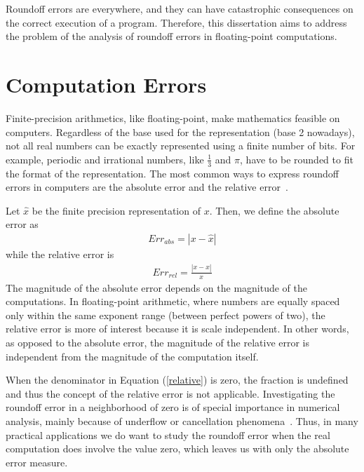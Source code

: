 Roundoff errors are everywhere, and they can have catastrophic consequences on the correct execution of a program.
%
Therefore, this dissertation aims to address the problem of the analysis of roundoff errors in floating-point computations.
%
\section{Computation Errors}
%

Finite-precision arithmetics, like floating-point, make mathematics feasible on computers. 
%
Regardless of the base used for the representation (base 2 nowadays), not all real numbers can be exactly represented using a finite number of bits.
%
For example, periodic and irrational numbers, like $\frac{1}{3}$ and $\pi$, have to be rounded to fit the format of the representation. 
%
%
%
The most common ways to express roundoff errors in computers are the absolute error and the relative error~\cite{higham2002accuracy}.
%

Let $\widehat{x}$ be the finite precision representation of $x$. Then, we define the absolute error as
%
\begin{align}
Err_{abs}=|x-\widehat{x}|\label{absolute}
\end{align}
%
while the relative error is
%
\begin{align}
Err_{rel}=\frac{|x-\widehat{x}|}{x}\label{relative}
\end{align}
%
The magnitude of the absolute error depends on the magnitude of the computations.
%
In floating-point arithmetic, where numbers are equally spaced only within the same exponent range (between perfect powers of two), the relative error is more of interest because it is scale independent.
%
In other words, as opposed to the absolute error, the magnitude of the relative error is independent from the magnitude of the computation itself.
%

%
When the denominator in Equation (\ref{relative}) is zero, the fraction is undefined and thus the concept of the relative error is not applicable.
%
Investigating the roundoff error in a neighborhood of zero is of special importance in numerical analysis, mainly because of underflow or cancellation phenomena~\cite{every}. Thus, in many practical applications we do want to study the roundoff error when the real computation does involve the value zero, which leaves us with only the absolute error measure.
%
